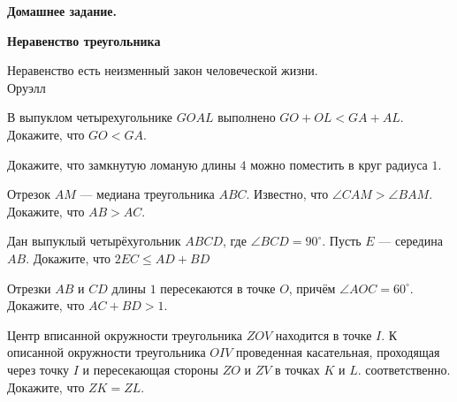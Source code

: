 \centerline{\bf \Huge Домашнее задание.}
\centerline{\bf \Huge Неравенство треугольника}

\begin{flushright}
        \scriptsize{Неравенство есть неизменный закон человеческой жизни.\\Оруэлл}
\end{flushright}

В выпуклом четырехугольнике $GOAL$ выполнено $GO + OL < GA + AL$. Докажите, что $GO < GA$.

Докажите, что замкнутую ломаную длины $4$ можно поместить в круг радиуса $1$.

Отрезок $AM$ --- медиана треугольника $ABC$. Известно, что $\angle C A M>\angle B A M$. Докажите, что $AB>AC$.

Дан выпуклый четырёхугольник $ABCD$, где $\angle BCD  = 90^{\circ}$. Пусть $E$ --- середина $AB$. Докажите, что $2EC \leq AD + BD$

Отрезки $AB$ и $CD$ длины $1$ пересекаются в точке $O$, причём $\angle AOC = 60^{\circ}$. Докажите, что $AC + BD > 1$.

Центр вписанной окружности треугольника $ZOV$ находится в точке $I$.
К описанной окружности треугольника $OIV$ проведенная касательная, проходящая через точку $I$ и пересекающая стороны $ZO$ и $ZV$ в точках $K$ и $L$. соответственно. Докажите, что $ZK = ZL$.